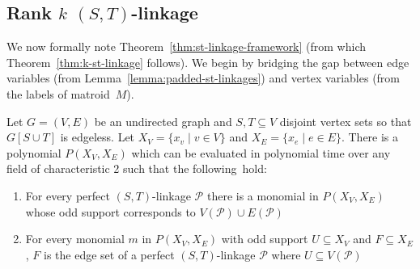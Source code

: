 \documentclass{theoretics}
\newcommand{\cP}{\ensuremath{\mathcal P}\xspace}
\begin{document}
\subsection{Rank \texorpdfstring{$k$ $(S,T)$}{k (S,T)}-linkage}

We now formally note Theorem~\ref{thm:st-linkage-framework}
(from which Theorem~\ref{thm:k-st-linkage} follows). 
We begin by bridging the gap between edge variables (from
Lemma~\ref{lemma:padded-st-linkages}) and vertex variables (from the
labels of matroid~$M$). 

\begin{lemma} \label{lemma:linkage-vertex-vars}
  Let $G=(V,E)$ be an undirected graph and $S, T \subseteq V$
  disjoint vertex sets so that $G[S \cup T]$ is edgeless.
  Let $X_V=\{x_v \mid v \in V\}$ and $X_E=\{x_e \mid e \in E\}$. 
  There is a polynomial $P(X_V,X_E)$ which can be evaluated in
  polynomial time over any field of characteristic 2
  such that the following~hold:
  \begin{enumerate}
  \item For every perfect $(S,T)$-linkage $\cP$ there is a monomial in $P(X_V,X_E)$
    whose odd support corresponds to $V(\cP) \cup E(\cP)$
  \item For every monomial $m$ in $P(X_V,X_E)$ with odd support
    $U \subseteq X_V$ and $F \subseteq X_E$, $F$ is the edge set of a
    perfect $(S,T)$-linkage $\cP$ where $U \subseteq V(\cP)$
  \end{enumerate}
\end{lemma}
\end{document}
